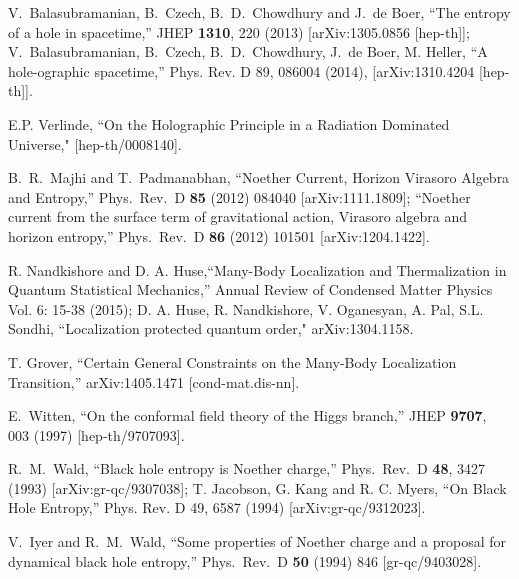 \documentclass[a4paper,12pt]{article}
\begin{document}
\begin{thebibliography}{100}
  V.~Balasubramanian, B.~Czech, B.~D.~Chowdhury and J.~de Boer,
  ``The entropy of a hole in spacetime,''
  JHEP {\bf 1310}, 220 (2013)
  [arXiv:1305.0856 [hep-th]]; V.~Balasubramanian, B.~Czech, B.~D.~Chowdhury, J.~de Boer, M. Heller, ``A hole-ographic spacetime,''  Phys. Rev. D 89, 086004 (2014),  [arXiv:1310.4204 [hep-th]].
  
 
  E.P. Verlinde, ``On the Holographic Principle in a Radiation Dominated Universe,"
  [hep-th/0008140].

  B.~R.~Majhi and T.~Padmanabhan,
  ``Noether Current, Horizon Virasoro Algebra and Entropy,''
  Phys.\ Rev.\ D {\bf 85} (2012) 084040
  [arXiv:1111.1809];
  ``Noether current from the surface term of gravitational action, Virasoro algebra and horizon entropy,''
  Phys.\ Rev.\ D {\bf 86} (2012) 101501
  [arXiv:1204.1422].
  

 R. Nandkishore and D. A. Huse,``Many-Body Localization and Thermalization in Quantum Statistical Mechanics,'' Annual Review of Condensed Matter Physics
Vol. 6: 15-38 (2015); 
D. A. Huse, R. Nandkishore, V. Oganesyan, A. Pal, S.L. Sondhi,  ``Localization protected quantum order," arXiv:1304.1158.


 T. Grover, ``Certain General Constraints on the Many-Body Localization Transition,'' arXiv:1405.1471 [cond-mat.dis-nn].

 
  E.~Witten,
  ``On the conformal field theory of the Higgs branch,''
  JHEP {\bf 9707}, 003 (1997)
  [hep-th/9707093].
 




 R.~M.~Wald,
 ``Black hole entropy is Noether charge,''
 Phys.\ Rev.\  D {\bf 48}, 3427 (1993)
 [arXiv:gr-qc/9307038]; T. Jacobson, G. Kang and R. C. Myers, ``On Black Hole Entropy,'' Phys. Rev. D 49, 6587 (1994) [arXiv:gr-qc/9312023].
 
  V.~Iyer and R.~M.~Wald,
  ``Some properties of Noether charge and a proposal for dynamical black hole entropy,''
  Phys.\ Rev.\ D {\bf 50} (1994) 846
  [gr-qc/9403028].


\end{thebibliography}
\end{document}
